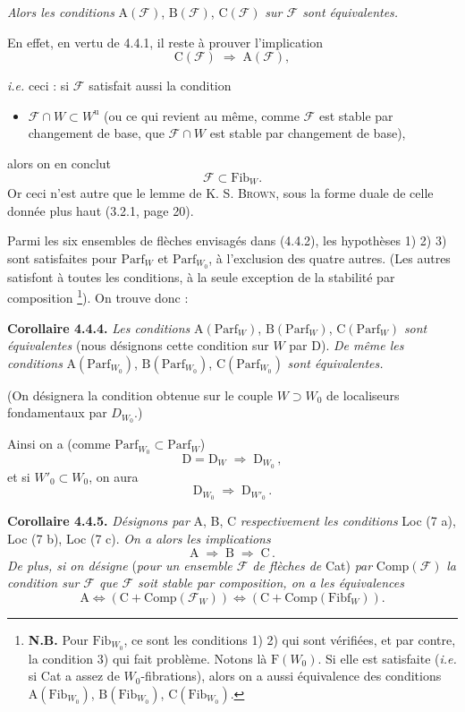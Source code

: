 \documentclass[11pt]{article}
\newcommand{\printedpage}[1]{\marginpar{\footnotesize p.~#1}}
\newcommand{\msp}[1]{\marginpar{\footnotesize [#1]}}
\newcommand{\cF}{\mathcal{F}}
\newcommand{\Fib}{\mathrm{Fib}}
\newcommand{\Fibf}{\mathrm{Fibf}}
\newcommand{\Parf}{\mathrm{Parf}}
\newcommand{\Comp}{\mathrm{Comp}}
\begin{document}
\printedpage{26}
\noindent\textit{Alors les conditions} $\mathrm{A}(\cF)$, $\mathrm{B}(\cF)$, $\mathrm{C}(\cF)$ \textit{sur $\cF$ sont équivalentes.}

En effet, en vertu de 4.4.1, il reste à prouver l'implication
\[
\mathrm{C}(\cF) \;\Longrightarrow\; \mathrm{A}(\cF),
\]

\msp{page 44}

\textit{i.e.} ceci : si $\cF$ satisfait aussi la condition
\begin{itemize}[leftmargin=3em]
\item[4)] $\cF \cap W \subset W^{\mathrm{u}}$ (ou ce qui revient au même, comme $\cF$ est stable par changement de base, que $\cF \cap W$ est stable par changement de base),
\end{itemize}
alors on en conclut
\[
\cF \subset \Fib_W.
\]
Or ceci n'est autre que le lemme de K. S. \textsc{Brown}, sous la forme duale de celle donnée plus haut (3.2.1, page 20).

Parmi les six ensembles de flèches envisagés dans (4.4.2), les hypothèses 1) 2) 3) sont satisfaites pour $\Parf_W$ et $\Parf_{W_0}$, à l'exclusion des quatre autres. (Les autres satisfont à toutes les conditions, à la seule exception de la stabilité par composition \footnote[30]{\textbf{N.B.} Pour $\Fib_{W_0}$, ce sont les conditions 1) 2) qui sont vérifiées, et par contre, la condition 3) qui fait problème. Notons là $\mathrm{F}(W_0)$. Si elle est satisfaite (\textit{i.e.} si Cat a assez de $W_0$-fibrations), alors on a aussi équivalence des conditions $\mathrm{A}(\Fib_{W_0})$, $\mathrm{B}(\Fib_{W_0})$, $\mathrm{C}(\Fib_{W_0})$.}). On trouve donc :

\textbf{Corollaire 4.4.4.} \textit{Les conditions} $\mathrm{A}(\Parf_W)$, $\mathrm{B}(\Parf_W)$, $\mathrm{C}(\Parf_W)$ \textit{sont équivalentes} (nous désignons cette condition sur $W$ par D). \textit{De même les conditions} $\mathrm{A}(\Parf_{W_0})$, $\mathrm{B}(\Parf_{W_0})$, $\mathrm{C}(\Parf_{W_0})$ \textit{sont équivalentes.}

\msp{page 45}

(On désignera la condition obtenue sur le couple $W \supset W_0$ de localiseurs fondamentaux par $D_{W_0}$.)

Ainsi on a (comme $\Parf_{W_0} \subset \Parf_W$)
\[
\mathrm{D} = \mathrm{D}_W \;\Longrightarrow\; \mathrm{D}_{W_0}\,,
\tag*{(4.4.4)}
\]
et si $W'_0 \subset W_0$, on aura
\[
\mathrm{D}_{W_0} \;\Longrightarrow\; \mathrm{D}_{W'_0}\,.
\tag*{(4.4.5)}
\]

\textbf{Corollaire 4.4.5.} \textit{Désignons par} A, B, C \textit{respectivement les conditions} Loc (7 a), Loc (7 b), Loc (7 c). \textit{On a alors les implications}
\[
\mathrm{A} \;\Longrightarrow\; \mathrm{B} \;\Longrightarrow\; \mathrm{C}\,.
\tag*{(4.4.5.1)}
\]
\textit{De plus, si on désigne} (\textit{pour un ensemble $\cF$ de flèches de} Cat) \textit{par} $\Comp(\cF)$ \textit{la condition sur $\cF$ que $\cF$ soit stable par composition, on a les équivalences}
\[
\mathrm{A} \iff (\mathrm{C} + \Comp(\cF_W)) \iff (\mathrm{C} + \Comp(\Fibf_W)).
\tag*{(4.4.5.2)}
\]
\end{document}

